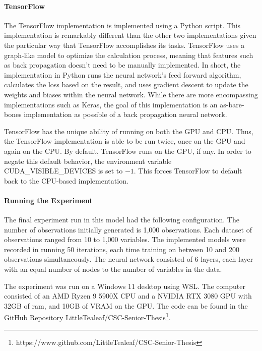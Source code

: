 \documentclass[12pt]{article}
\begin{document}
\paragraph{TensorFlow}

The TensorFlow \cite{lib_tensorflow} implementation is implemented using a Python \cite{lang_python} script.
This implementation is remarkably different than the other two implementations given the particular way that TensorFlow accomplishes its tasks.
TensorFlow uses a graph-like model to optimize the calculation process, meaning that features such as back propagation doesn't need to be manually implemented.
In short, the implementation in Python runs the neural network's feed forward algorithm, calculates the loss based on the result, and uses gradient descent to update the weights and biases within the neural network.
While there are more encompassing implementations such as Keras, the goal of this implementation is an as-bare-bones implementation as possible of a back propagation neural network.

TensorFlow has the unique ability of running on both the GPU and CPU.
Thus, the TensorFlow implementation is able to be run twice, once on the GPU and again on the CPU.
By default, TensorFlow runs on the GPU, if any.
In order to negate this default behavior, the environment variable CUDA\_VISIBLE\_DEVICES is set to $-1$.
This forces TensorFlow to default back to the CPU-based implementation.

\paragraph{Running the Experiment}

The final experiment run in this model had the following configuration.
The number of observations initially generated is 1,000 observations.
Each dataset of observations ranged from 10 to 1,000 variables.
The implemented models were recorded in running 50 iterations, each time training on between 10 and 200 observations simultaneously.
The neural network consisted of 6 layers, each layer with an equal number of nodes to the number of variables in the data.

The experiment was run on a Windows 11 desktop using WSL.
The computer consisted of an AMD Ryzen 9 5900X CPU and a NVIDIA RTX 3080 GPU with 32GB of ram, and 10GB of VRAM on the GPU.
The code can be found in the GitHub Repository LittleTealeaf/CSC-Senior-Thesis\footnote{https://www.github.com/LittleTealeaf/CSC-Senior-Thesis}.
\end{document}
